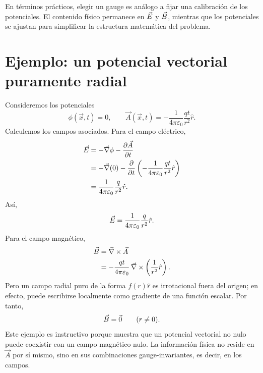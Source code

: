 \documentclass[../main.tex]{subfiles}
\begin{document}
En términos prácticos, elegir un gauge es análogo a fijar una calibración de los potenciales. El contenido físico permanece en $\vec{E}$ y $\vec{B}$, mientras que los potenciales se ajustan para simplificar la estructura matemática del problema.

\section*{Ejemplo: un potencial vectorial puramente radial}
Consideremos los potenciales
\begin{equation*}
    \phi(\vec x,t)=0,
    \qquad
    \vec A(\vec x,t)= -\frac{1}{4\pi\varepsilon_0}\frac{qt}{r^2}\hat r.
\end{equation*}
Calculemos los campos asociados. Para el campo eléctrico,
\begin{align*}
    \vec{E} &= -\vec\nabla\phi - \frac{\partial \vec A}{\partial t} \\
    &= -\vec\nabla(0) - \frac{\partial}{\partial t}\left(-\frac{1}{4\pi\varepsilon_0}\frac{qt}{r^2}\hat r\right) \\
    &= \frac{1}{4\pi\varepsilon_0}\frac{q}{r^2}\hat r.
\end{align*}
Así,
\begin{equation*}
    \vec{E} = \frac{1}{4\pi\varepsilon_0}\frac{q}{r^2}\hat r.
\end{equation*}
Para el campo magnético,
\begin{align*}
    \vec{B} &= \vec\nabla\times\vec A \\
    &= -\frac{qt}{4\pi\varepsilon_0}\,\vec\nabla\times\left(\frac{1}{r^2}\hat r\right).
\end{align*}
Pero un campo radial puro de la forma $f(r)\hat r$ es irrotacional fuera del origen; en efecto, puede escribirse localmente como gradiente de una función escalar. Por tanto,
\begin{equation*}
    \vec{B} = \vec 0
    \qquad (r\neq 0).
\end{equation*}
Este ejemplo es instructivo porque muestra que un potencial vectorial no nulo puede coexistir con un campo magnético nulo. La información física no reside en $\vec A$ por sí mismo, sino en sus combinaciones gauge-invariantes, es decir, en los campos.
\end{document}
